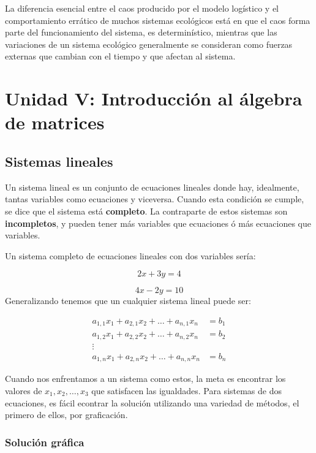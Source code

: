 \documentclass[
]{book}
\begin{document}
La diferencia esencial entre el caos producido por el modelo logístico y el comportamiento errático de muchos sistemas ecológicos está en que el caos forma parte del funcionamiento del sistema, es determinístico, mientras que las variaciones de un sistema ecológico generalmente se consideran como fuerzas externas que cambian con el tiempo y que afectan al sistema.

\hypertarget{unidad-v-introducciuxf3n-al-uxe1lgebra-de-matrices}{%
\chapter{Unidad V: Introducción al álgebra de matrices}\label{unidad-v-introducciuxf3n-al-uxe1lgebra-de-matrices}}

\hypertarget{sistemas-lineales}{%
\section{Sistemas lineales}\label{sistemas-lineales}}

Un sistema lineal es un conjunto de ecuaciones lineales donde hay, idealmente, tantas variables como ecuaciones y viceversa. Cuando esta condición se cumple, se dice que el sistema está \textbf{completo}. La contraparte de estos sistemas son \textbf{incompletos}, y pueden tener más variables que ecuaciones ó más ecuaciones que variables.

Un sistema completo de ecuaciones lineales con dos variables sería:

\[2x + 3y = 4\]

\[4x - 2y =10\]
Generalizando tenemos que un cualquier sistema lineal puede ser:

\begin{align}
a_{1,1}x_1+a_{2,1}x_2 + \dots + a_{n,1}x_n & = b_1\\
a_{1,2}x_1+a_{2,2}x_2 + \dots + a_{n,2}x_n & = b_2\\
\vdots & \\
a_{1, n}x_1+a_{2,n}x_2 + \dots + a_{n,n}x_n & = b_n
\end{align}

Cuando nos enfrentamos a un sistema como estos, la meta es encontrar los valores de \(x_1, x_2, \dots , x_3\) que satisfacen las igualdades. Para sistemas de dos ecuaciones, es fácil econtrar la solución utilizando una variedad de métodos, el primero de ellos, por graficación.

\hypertarget{soluciuxf3n-gruxe1fica}{%
\subsection{Solución gráfica}\label{soluciuxf3n-gruxe1fica}}
\end{document}
